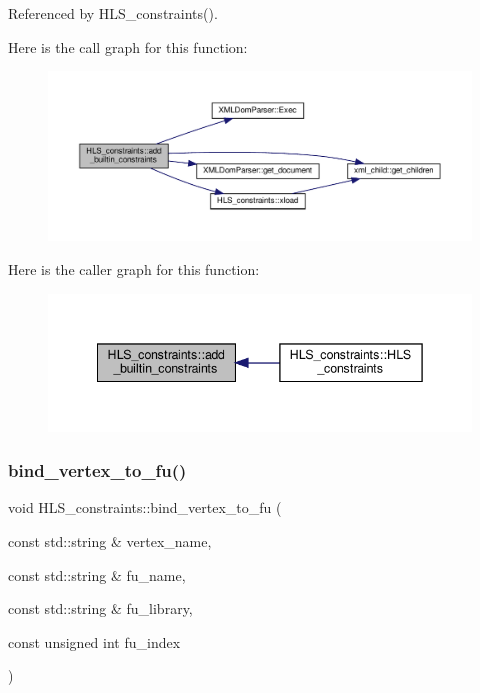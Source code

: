 Referenced by H\+L\+S\+\_\+constraints().

Here is the call graph for this function\+:
\nopagebreak
\begin{figure}[H]
\begin{center}
\leavevmode
\includegraphics[width=350pt]{dd/d96/classHLS__constraints_a26ccdc010e4ed339801844cb83392caa_cgraph}
\end{center}
\end{figure}
Here is the caller graph for this function\+:
\nopagebreak
\begin{figure}[H]
\begin{center}
\leavevmode
\includegraphics[width=342pt]{dd/d96/classHLS__constraints_a26ccdc010e4ed339801844cb83392caa_icgraph}
\end{center}
\end{figure}
\mbox{\label{classHLS__constraints_a059b4544182407ed8966208698ab2428}} 
\subsubsection{\texorpdfstring{bind\+\_\+vertex\+\_\+to\+\_\+fu()}{bind\_vertex\_to\_fu()}}
{\footnotesize\ttfamily void H\+L\+S\+\_\+constraints\+::bind\+\_\+vertex\+\_\+to\+\_\+fu (\begin{DoxyParamCaption}\item[{const std\+::string \&}]{vertex\+\_\+name,  }\item[{const std\+::string \&}]{fu\+\_\+name,  }\item[{const std\+::string \&}]{fu\+\_\+library,  }\item[{const unsigned int}]{fu\+\_\+index }\end{DoxyParamCaption})}



